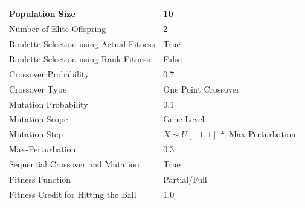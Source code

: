 \documentclass[a4paper,10pt]{article}
\begin{document}
\begin{table}[H]
\centering
\footnotesize
\begin{tabular}{ |>{\columncolor[gray]{0.8}} l | l| }
\hline
Population Size                                                      & 10                                                        \\ \hline
Number of Elite Offspring                                            & 2                                                         \\ \hline
Roulette Selection using Actual Fitness                              & True                                                      \\ \hline
Roulette Selection using Rank Fitness                                & False                                                     \\ \hline
Crossover Probability                                                & 0.7                                                       \\ \hline
Crossover Type                                                       & One Point Crossover                                       \\ \hline
Mutation Probability                                                 & 0.1                                                       \\ \hline
Mutation Scope                                                       & Gene Level                                                \\ \hline
Mutation Step                                                        & $X\sim U[-1,1] \ *$ Max-Perturbation                      \\ \hline
Max-Perturbation                                                     & 0.3                                                       \\ \hline
Sequential Crossover and Mutation                                    & True                                                      \\ \hline
Fitness Function                                                     & Partial/Full                                              \\ \hline
Fitness Credit for Hitting the Ball                                  & 1.0                                                       \\ \hline

\end{tabular}
\end{table}
\end{document}
